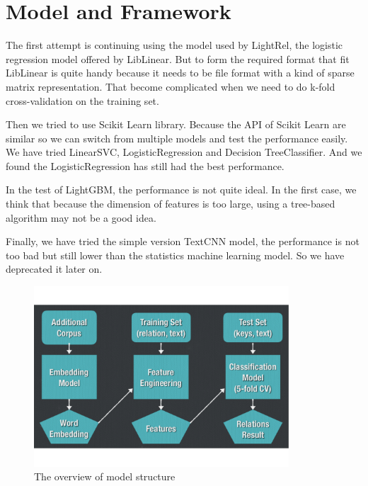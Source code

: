 \section{Model and Framework}
\label{sec:model_and_framework}

The first attempt is continuing using the model used by LightRel, the logistic regression model offered by LibLinear. But to form the required format that fit LibLinear is quite handy because it needs to be file format with a kind of sparse matrix representation. That become complicated when we need to do k-fold cross-validation on the training set.

Then we tried to use Scikit Learn library. Because the API of Scikit Learn are similar so we can switch from multiple models and test the performance easily. We have tried LinearSVC, LogisticRegression and Decision TreeClassifier. And we found the LogisticRegression has still had the best performance.

In the test of LightGBM, the performance is not quite ideal. In the first case, we think that because the dimension of features is too large, using a tree-based algorithm may not be a good idea.

Finally, we have tried the simple version TextCNN model, the performance is not too bad but still lower than the statistics machine learning model. So we have deprecated it later on.

\begin{figure}[ht]
    \begin{center}
    \includegraphics[width=0.85\textwidth]{figures/overall_model.pdf}
    \end{center}
    \caption{The overview of model structure}
    \label{fig:overall_model}
\end{figure}

